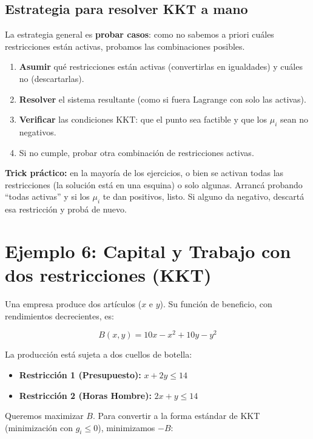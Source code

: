 \documentclass[12pt]{article}
\begin{document}
\subsection{Estrategia para resolver KKT a mano}

La estrategia general es \textbf{probar casos}: como no sabemos a priori cuáles restricciones están activas, probamos las combinaciones posibles.

\begin{enumerate}
    \item \textbf{Asumir} qué restricciones están activas (convertirlas en igualdades) y cuáles no (descartarlas).
    \item \textbf{Resolver} el sistema resultante (como si fuera Lagrange con solo las activas).
    \item \textbf{Verificar} las condiciones KKT: que el punto sea factible y que los $\mu_i$ sean no negativos.
    \item Si no cumple, probar otra combinación de restricciones activas.
\end{enumerate}

\vspace{0.5em}

\textbf{Trick práctico:} en la mayoría de los ejercicios, o bien se activan todas las restricciones (la solución está en una esquina) o solo algunas. Arrancá probando ``todas activas'' y si los $\mu_i$ te dan positivos, listo. Si alguno da negativo, descartá esa restricción y probá de nuevo.

\section{Ejemplo 6: Capital y Trabajo con dos restricciones (KKT)}

Una empresa produce dos artículos ($x$ e $y$). Su función de beneficio, con rendimientos decrecientes, es:

\[
B(x, y) = 10x - x^2 + 10y - y^2
\]

La producción está sujeta a dos cuellos de botella:

\begin{itemize}
    \item \textbf{Restricción 1 (Presupuesto):} $x + 2y \leq 14$
    \item \textbf{Restricción 2 (Horas Hombre):} $2x + y \leq 14$
\end{itemize}

Queremos maximizar $B$. Para convertir a la forma estándar de KKT (minimización con $g_i \leq 0$), minimizamos $-B$:
\end{document}

